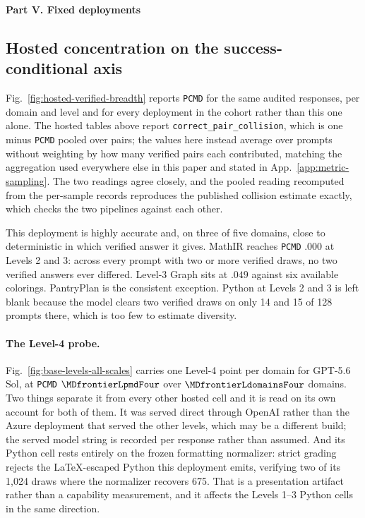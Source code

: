 \documentclass{article}
\newcommand{\1}{\mathbf 1}
\newcommand{\pmd}{\texttt{PCMD}}
\theoremstyle{remark}
\theoremstyle{definition}
\theoremstyle{plain}
\begin{document}




\clearpage
{}
\begin{center}\large\textbf{Part V. Fixed deployments}\end{center}



\subsection{Hosted concentration on the success-conditional axis}
\label{app:hosted-mode-diversity}

Fig.~\ref{fig:hosted-verified-breadth} reports \pmd{} for the same audited
responses, per domain and level and for every deployment in the cohort rather
than this one alone. The hosted tables above report \texttt{correct\_pair\_collision},
which is one minus \pmd{} pooled over pairs; the values here instead average
over prompts without weighting by how many verified pairs each contributed,
matching the aggregation used everywhere else in this paper and stated in
App.~\ref{app:metric-sampling}. The two readings agree closely,
and the pooled reading recomputed from the per-sample records reproduces the
published collision estimate exactly, which checks the two pipelines against
each other.

This deployment is highly accurate and, on three of five domains, close to
deterministic in which verified answer it gives. MathIR reaches \pmd{} $.000$
at Levels 2 and 3: across every prompt with two or more verified draws, no two
verified answers ever differed. Level-3 Graph sits at $.049$ against six
available colorings. PantryPlan is the consistent exception. Python at Levels 2
and 3 is left blank because the model clears two verified draws on only 14 and
15 of 128 prompts there, which is too few to estimate diversity.

\paragraph{The Level-4 probe.}
Fig.~\ref{fig:base-levels-all-scales} carries one Level-4 point per domain for
GPT-5.6 Sol, at \pmd{} $\MDfrontierLpmdFour$ over $\MDfrontierLdomainsFour$
domains. Two things separate it from every other hosted cell and it is read
on its own account for both of them. It was
served direct through OpenAI rather than the Azure deployment that served the
other levels, which may be a different build; the served model string is
recorded per response rather than assumed. And its Python cell rests entirely on
the frozen formatting normalizer: strict grading rejects the LaTeX-escaped
Python this deployment emits, verifying two of its 1,024 draws where the
normalizer recovers 675. That is a presentation artifact rather than a capability
measurement, and it affects the Levels 1--3 Python cells in the same direction.
\end{document}
